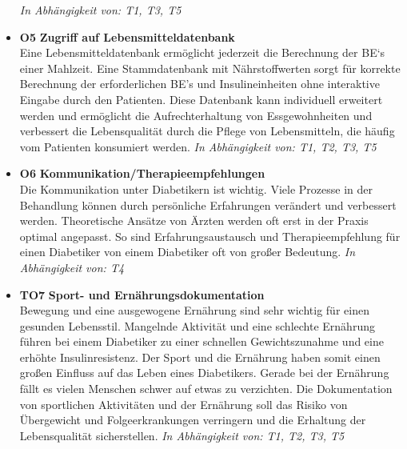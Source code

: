 \begin{itemize}
	\emph{In Abhängigkeit von: T1, T3, T5} 
	\item \lbrack \textbf{O5}\rbrack \textbf{ Zugriff auf Lebensmitteldatenbank} \\
	Eine Lebensmitteldatenbank ermöglicht jederzeit die Berechnung der BE‘s einer Mahlzeit. Eine Stammdatenbank mit Nährstoffwerten sorgt für korrekte Berechnung der erforderlichen BE’s und Insulineinheiten ohne interaktive Eingabe durch den Patienten. Diese Datenbank kann individuell erweitert werden und ermöglicht die Aufrechterhaltung von Essgewohnheiten und verbessert die Lebensqualität durch die Pflege von Lebensmitteln, die häufig vom Patienten konsumiert werden.\newline
	\emph{In Abhängigkeit von: T1, T2, T3, T5} 
	\item \lbrack \textbf{O6}\rbrack \textbf{ Kommunikation/Therapieempfehlungen} \\
	Die Kommunikation unter Diabetikern ist wichtig. Viele Prozesse in der Behandlung können durch persönliche Erfahrungen verändert und verbessert werden. Theoretische Ansätze von Ärzten werden oft erst in der Praxis optimal angepasst. So sind Erfahrungsaustausch und Therapieempfehlung für einen Diabetiker von einem Diabetiker oft von großer Bedeutung. \newline
	\emph{In Abhängigkeit von: T4} 
	\item \lbrack \textbf{TO7}\rbrack \textbf{ Sport- und Ernährungsdokumentation} \\
	Bewegung und eine ausgewogene Ernährung sind sehr wichtig für einen gesunden Lebensstil. Mangelnde Aktivität und eine schlechte Ernährung führen bei einem Diabetiker zu einer schnellen Gewichtszunahme und eine erhöhte Insulinresistenz. Der Sport und die Ernährung haben somit einen großen Einfluss auf das Leben eines Diabetikers. Gerade bei der Ernährung fällt es vielen Menschen schwer auf etwas zu verzichten. Die Dokumentation von sportlichen Aktivitäten und der Ernährung soll das Risiko von Übergewicht und Folgeerkrankungen verringern und die Erhaltung der Lebensqualität sicherstellen.\newline
	\emph{In Abhängigkeit von: T1, T2, T3, T5} 
\end{itemize}